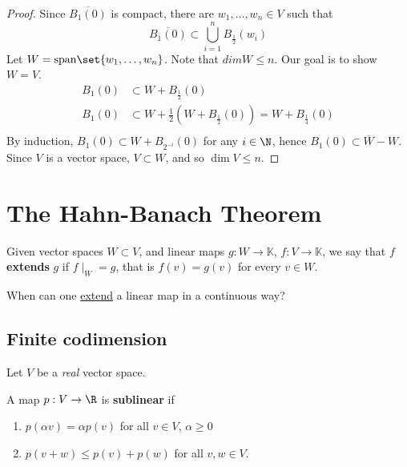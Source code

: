 \documentclass{article}
\newcommand{\K}{\mathbb{K}}
\begin{document}
\begin{proof}
    Since $\overline{B_1(0)}$ is compact, there are $w_1, \dotsc, w_n \in V$ such that
    \begin{equation}
        \overline{B_1(0)} \subset \bigcup_{i=1}^n B_{\frac12} (w_i)
    \end{equation}
    Let $W = \mathrm{span}\set{w_1, \dotsc, w_n}$. Note that $dim W \leq n$. Our goal is to show $W = V$.
    \begin{align*}
        B_1(0) &\subset W + B_{\frac{1}{2}} (0) \\
        B_1(0) &\subset W + \frac{1}{2}\left(W + B_{\frac{1}{2}} (0)\right) = W + B_{\frac{1}{4}}(0) \\
    \end{align*}
    By induction, $B_1(0) \subset W + B_{2^{-i}}(0)$ for any $i \in \N$, hence $B_1(0) \subset \overline{W} - W$. Since $V$ is a vector space, $V \subset W$, and so $\dim V \leq n$.
\end{proof}

\clearpage

\section{The Hahn-Banach Theorem}

\begin{defi}
    Given vector spaces $W \subset V$, and linear maps $g: W \to \K$, $f: V \to \K$, we say that $f$ \textbf{extends} $g$ if $f \mid_W = g$, that is $f(v) = g(v)$ for every $v \in W$.
\end{defi}

When can one \hyperlink{def:extend}{extend} a linear map in a continuous way?

\subsection{Finite codimension}

Let $V$ be a \emph{real} vector space.

\begin{defi}
    A map $p: V \to \R$ is \textbf{sublinear} if
    \begin{enumerate}
        \item $p(\alpha v) = \alpha p(v)$ for all $v \in V$, $\alpha \geq 0$
        \item $p(v + w) \leq p(v) + p(w)$ for all $v, w \in V$.
    \end{enumerate}
\end{defi}
\end{document}
